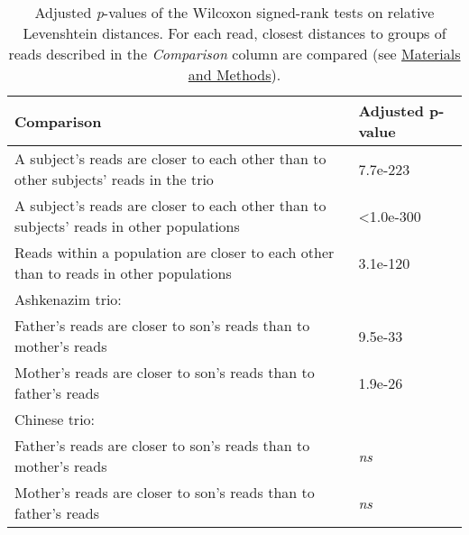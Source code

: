 \begin{samepage} \begin{table}[h!] \small \begin{tabular}{ll}
\hline
\textbf{Comparison}                                                                     & \textbf{Adjusted p-value} \\
\hline
A subject's reads are closer to each other than to other subjects' reads in the trio    & 7.7e-223                  \\
A subject's reads are closer to each other than to subjects' reads in other populations & <1.0e-300                 \\
Reads within a population are closer to each other than to reads in other populations   & 3.1e-120                  \\
Ashkenazim trio:                                                                        & \textbf{}                 \\
\hspace{.5cm} Father's reads are closer to son's reads than to mother's reads           & 9.5e-33                   \\
\hspace{.5cm} Mother's reads are closer to son's reads than to father's reads           & 1.9e-26                   \\
Chinese trio:                                                                           & \textbf{}                 \\
\hspace{.5cm} Father's reads are closer to son's reads than to mother's reads           & \textit{ns}               \\
\hspace{.5cm} Mother's reads are closer to son's reads than to father's reads           & \textit{ns}               \\
\hline
\end{tabular}
\caption{
    \small Adjusted \textit{p}-values of the Wilcoxon signed-rank tests on relative Levenshtein distances.
    For each read, closest distances to groups of reads described in the \textit{Comparison} column are compared
    (see \hyperref[sec:methods]{Materials and Methods}).
}
\label{tab:haptests}
\end{table}
\end{samepage}
